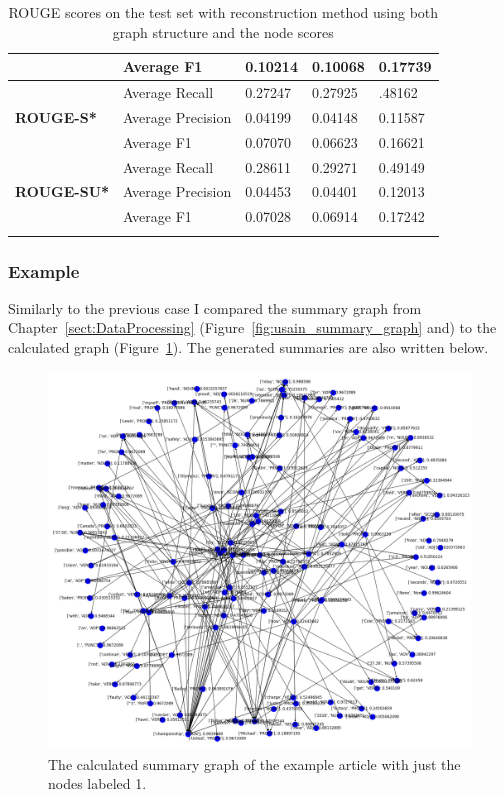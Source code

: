 \begin{longtable}{| l | l | l | l | l |}
	&Average F1&0.10214&0.10068&0.17739 \\ \hline \hline
	\multirow{3}{*}{\textbf{ROUGE-S*}}
	&Average Recall&0.27247&0.27925&.48162 \\
	&Average Precision&0.04199&0.04148&0.11587 \\
	&Average F1&0.07070&0.06623&0.16621 \\ \hline \hline
	\multirow{3}{*}{\textbf{ROUGE-SU*}}
	&Average Recall&0.28611&0.29271&0.49149 \\
	&Average Precision&0.04453&0.04401&0.12013 \\
	&Average F1&0.07028&0.06914&0.17242 \\ \hline
	\caption{ROUGE scores on the test set with reconstruction method using both graph structure and the node scores}
\end{longtable}

\subsubsection{Example}
Similarly to the previous case I compared the summary graph from Chapter~\ref{sect:DataProcessing} (Figure~\ref{fig:usain_summary_graph} and) to the calculated graph (Figure~\ref{fig:usain_bolt_predicted1}). The generated summaries are also written below.

\begin{figure}[!ht]
	\centering
	\includegraphics[width=150mm, keepaspectratio]{figures/usain_bolt_predicted_attended.png}
	\caption{The calculated summary graph of the example article with just the nodes labeled 1.}
	\label{fig:usain_bolt_predicted1}
\end{figure}

